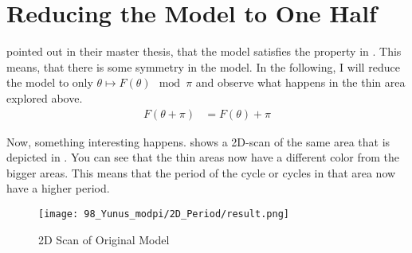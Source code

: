 \section{Reducing the Model to One Half}

 pointed out in their master thesis, that the model satisfies the property in .
This means, that there is some symmetry in the model.
In the following, I will reduce the model to only $\theta \mapsto F(\theta) \mod \pi$ and observe what happens in the thin area explored above.
\begin{align}
    F(\theta + \pi) & = F(\theta) + \pi \label{equ:yunus.property.symmetry}
\end{align}

Now, something interesting happens.
 shows a 2D-scan of the same area that is depicted in .
You can see that the thin areas now have a different color from the bigger areas.
This means that the period of the cycle or cycles in that area now have a higher period.

\begin{figure}
    \centering
    \texttt{[image: 98\_Yunus\_modpi/2D\_Period/result.png]}
    \caption{2D Scan of Original Model}
    \label{fig:yunus.pi.2d.full}
\end{figure}
